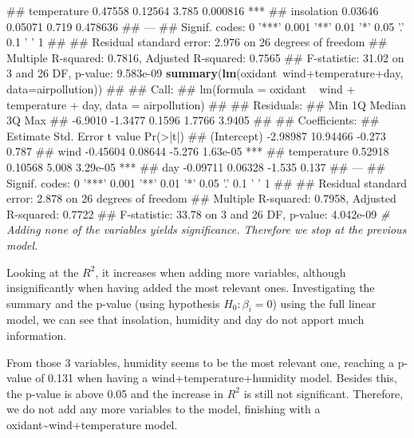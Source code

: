\documentclass[11pt,]{article}
\newenvironment{Shaded}{\begin{snugshade}}{\end{snugshade}}
\newcommand{\KeywordTok}[1]{\textcolor[rgb]{0.13,0.29,0.53}{\textbf{{#1}}}}
\newcommand{\DataTypeTok}[1]{\textcolor[rgb]{0.13,0.29,0.53}{{#1}}}
\newcommand{\CommentTok}[1]{\textcolor[rgb]{0.56,0.35,0.01}{\textit{{#1}}}}
\newcommand{\NormalTok}[1]{{#1}}
\begin{document}
\begin{Shaded}
\begin{Highlighting}[]
\NormalTok{## temperature  0.47558    0.12564   3.785 0.000816 ***}
\NormalTok{## insolation   0.03646    0.05071   0.719 0.478636    }
\NormalTok{## ---}
\NormalTok{## Signif. codes:  0 '***' 0.001 '**' 0.01 '*' 0.05 '.' 0.1 ' ' 1}
\NormalTok{## }
\NormalTok{## Residual standard error: 2.976 on 26 degrees of freedom}
\NormalTok{## Multiple R-squared:  0.7816, Adjusted R-squared:  0.7565 }
\NormalTok{## F-statistic: 31.02 on 3 and 26 DF,  p-value: 9.583e-09}
\KeywordTok{summary}\NormalTok{(}\KeywordTok{lm}\NormalTok{(oxidant~wind+temperature+day, }\DataTypeTok{data=}\NormalTok{airpollution))}
\NormalTok{## }
\NormalTok{## Call:}
\NormalTok{## lm(formula = oxidant ~ wind + temperature + day, data = airpollution)}
\NormalTok{## }
\NormalTok{## Residuals:}
\NormalTok{##     Min      1Q  Median      3Q     Max }
\NormalTok{## -6.9010 -1.3477  0.1596  1.7766  3.9405 }
\NormalTok{## }
\NormalTok{## Coefficients:}
\NormalTok{##             Estimate Std. Error t value Pr(>|t|)    }
\NormalTok{## (Intercept) -2.98987   10.94466  -0.273    0.787    }
\NormalTok{## wind        -0.45604    0.08644  -5.276 1.63e-05 ***}
\NormalTok{## temperature  0.52918    0.10568   5.008 3.29e-05 ***}
\NormalTok{## day         -0.09711    0.06328  -1.535    0.137    }
\NormalTok{## ---}
\NormalTok{## Signif. codes:  0 '***' 0.001 '**' 0.01 '*' 0.05 '.' 0.1 ' ' 1}
\NormalTok{## }
\NormalTok{## Residual standard error: 2.878 on 26 degrees of freedom}
\NormalTok{## Multiple R-squared:  0.7958, Adjusted R-squared:  0.7722 }
\NormalTok{## F-statistic: 33.78 on 3 and 26 DF,  p-value: 4.042e-09}
\CommentTok{# Adding none of the variables yields significance. Therefore we stop at the previous model.}
\end{Highlighting}
\end{Shaded}

Looking at the \(R^2\), it increases when adding more variables,
although insignificantly when having added the most relevant ones.
Investigating the summary and the p-value (using hypothesis
\(H_0:\beta_i=0\)) using the full linear model, we can see that
insolation, humidity and day do not apport much information.

From those 3 variables, humidity seems to be the most relevant one,
reaching a p-value of 0.131 when having a wind+temperature+humidity
model. Besides this, the p-value is above 0.05 and the increase in
\(R^2\) is still not significant. Therefore, we do not add any more
variables to the model, finishing with a
oxidant\textasciitilde{}wind+temperature model.
\end{document}
